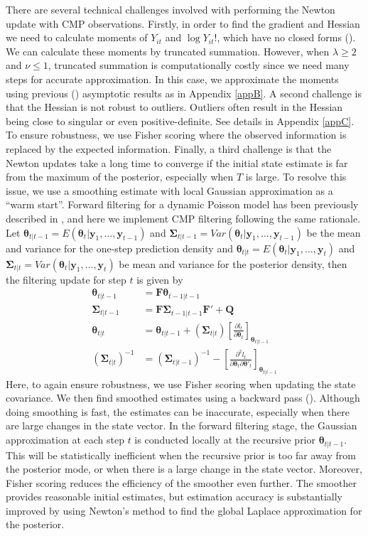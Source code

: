 \documentclass[aoas]{imsart}
\theoremstyle{plain}
\theoremstyle{remark}
\begin{document}
There are several technical challenges involved with performing the Newton update with CMP observations. Firstly, in order to find the gradient and Hessian we need to calculate moments of $Y_{it}$ and $\log Y_{it}!$, which have no closed forms (\cite{Shmueli2005}). We can calculate these moments by truncated summation. However, when $\lambda \geq 2$ and $\nu \leq 1$,  truncated summation is computationally costly since we need many steps for accurate approximation. In this case, we approximate the moments using previous (\cite{Chatla2018,Gaunt2019}) asymptotic results as in Appendix \ref{appB}. A second challenge is that the Hessian is not robust to outliers. Outliers often result in the Hessian being close to singular or even positive-definite. See details in Appendix \ref{appC}. To ensure robustness, we use Fisher scoring where the observed information is replaced by the expected information. Finally, a third challenge is that the Newton updates take a long time to converge if the initial state estimate is far from the maximum of the posterior, especially when $T$ is large. To resolve this issue, we use a smoothing estimate with local Gaussian approximation as a “warm start”. Forward filtering for a dynamic Poisson model has been previously described in \cite{Eden2004}, and here we implement CMP filtering following the same rationale. Let $\bm{\theta}_{t|t-1} = E(\bm{\theta}_t|\bm{y}_1,\ldots,\bm{y}_{t-1})$ and $\bm{\Sigma}_{t|t-1} = Var(\bm{\theta}_t|\bm{y}_1,\ldots,\bm{y}_{t-1})$ be the mean and variance for the one-step prediction density and $\bm{\theta}_{t|t} = E(\bm{\theta}_t|\bm{y}_1,\ldots,\bm{y}_{t})$ and $\bm{\Sigma}_{t|t} = Var(\bm{\theta}_t|\bm{y}_1,\ldots,\bm{y}_t)$ be mean and variance for the posterior density, then the filtering update for step $t$ is given by
\begin{align}
	\bm{\theta}_{t|t-1} &= \bm{F\theta}_{t-1|t-1}\\
	\bm{\Sigma}_{t|t-1} &= \bm{F\Sigma}_{t-1|t-1}\bm{F}' + \bm{Q} \nonumber\\
	\bm{\theta}_{t|t} &= \bm{\theta}_{t|t-1} + (\bm{\Sigma}_{t|t})\left[\frac{\partial l_t}{\partial \bm{\theta}_t}\right]_{\bm{\theta}_{t|t-1}} \nonumber\\
	(\bm{\Sigma}_{t|t})^{-1} &= (\bm{\Sigma}_{t|t-1})^{-1} - \left[\frac{\partial^2l_t}{\partial\bm{\theta}_t\partial\bm{\theta}'_t}\right]_{\bm{\theta}_{t|t-1}} \nonumber
\end{align}
Here, to again ensure robustness, we use Fisher scoring when updating the state covariance. We then find smoothed estimates using a backward pass (\cite{RAUCH1965}). Although doing smoothing is fast, the estimates can be inaccurate, especially when there are large changes in the state vector. In the forward filtering stage, the Gaussian approximation at each step $t$ is conducted locally at the recursive prior $\bm{\theta}_{t|t-1}$. This will be statistically inefficient when the recursive prior is too far away from the posterior mode, or when there is a large change in the state vector. Moreover, Fisher scoring reduces the efficiency of the smoother even further. The smoother provides reasonable initial estimates, but estimation accuracy is substantially improved by using Newton’s method to find the global Laplace approximation for the posterior.
\end{document}
